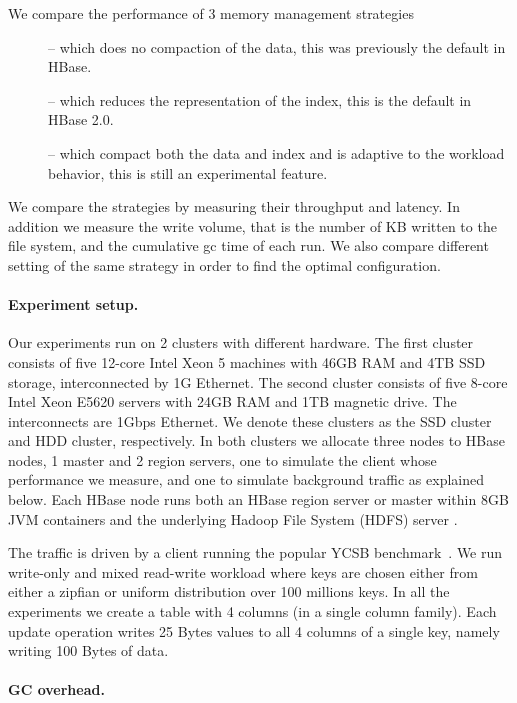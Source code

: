 We compare the performance of 3 memory management strategies 
\begin{description}
\item[\none] -- which does no compaction of the data, this was previously the default in HBase.
\item[\basic] -- which reduces the representation of the index, this is the default in HBase 2.0.
\item[\magic] -- which compact both the data and index and is adaptive to the workload behavior, this is still an experimental feature.
\end{description}

We compare the strategies by measuring their throughput and latency. In addition we measure the write volume, that is the number of KB written to the file system, and the cumulative gc time of each run.
We also compare different setting of the same strategy in order to find the optimal configuration.

\paragraph{Experiment setup.}

Our experiments run on 2  clusters with different hardware. 
The first cluster consists of five 12-core Intel Xeon 5 machines with 46GB RAM and 4TB 
SSD storage, interconnected by 1G Ethernet. 
The second cluster consists of five 8-core 
Intel Xeon E5620 servers with 24GB RAM and 1TB magnetic drive. The interconnects  are 1Gbps Ethernet. 
We denote these clusters as the SSD cluster and HDD cluster, respectively.
In both clusters we allocate three nodes to HBase nodes, 1 master and 2 region servers, one to simulate the client whose performance we measure, and one to simulate background traffic
as explained below. Each HBase node runs both an HBase region server or master within 8GB JVM containers and the underlying 
Hadoop File System (HDFS) server . 

The traffic is driven by a client running the popular YCSB benchmark~\cite{Cooper}. 
We run write-only and mixed read-write workload where keys are chosen either from either a zipfian or uniform distribution over 100 millions keys.
In all the experiments we create a table with 4 columns (in a single column family). Each update operation writes 25 Bytes values to all 4 columns of a single key, namely writing 100 Bytes of data.


\paragraph{GC overhead.}

